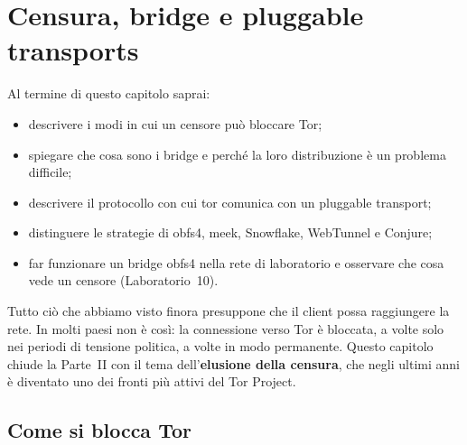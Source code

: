 \chapter{Censura, bridge e pluggable transports}\label{cap:16-censura}

\begin{obiettivi}
Al termine di questo capitolo saprai:
\begin{itemize}[nosep]
  \item descrivere i modi in cui un censore può bloccare Tor;
  \item spiegare che cosa sono i bridge e perché la loro distribuzione è un problema difficile;
  \item descrivere il protocollo con cui tor comunica con un pluggable transport;
  \item distinguere le strategie di obfs4, meek, Snowflake, WebTunnel e Conjure;
  \item far funzionare un bridge obfs4 nella rete di laboratorio e osservare che cosa vede un censore (Laboratorio~10).
\end{itemize}
\end{obiettivi}

Tutto ciò che abbiamo visto finora presuppone che il client possa raggiungere la rete. In molti paesi non è così: la connessione verso Tor è bloccata, a volte solo nei periodi di tensione politica, a volte in modo permanente. Questo capitolo chiude la Parte~II con il tema dell'\textbf{elusione della censura}, che negli ultimi anni è diventato uno dei fronti più attivi del Tor Project.

\section{Come si blocca Tor}\label{sec:cens-blocco}

